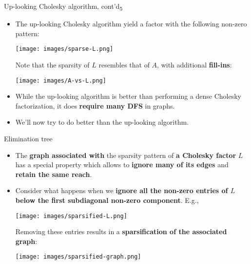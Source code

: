 \documentclass[t,usepdftitle=false]{beamer}
\begin{document}
\begin{frame}{Up-looking Cholesky algorithm, cont'd\textsubscript{5}}
\begin{itemize}
\item The up-looking Cholesky algorithm yield a factor with the following non-zero pattern:\\
\begin{center}
\texttt{[image: images/sparse-L.png]}
\end{center}
\vspace{.1cm}
Note that the sparsity of $L$ resembles that of $A$, with additional \textbf{fill-ins}:\vspace{.2cm}\\
\begin{center}
\texttt{[image: images/A-vs-L.png]}
\end{center}
\item While the up-looking algorithm is better than performing a dense Cholesky factorization, it does \textbf{require many DFS} in graphs.
\item We'll now try to do better than the up-looking algorithm.
\end{itemize}
\end{frame}

\begin{frame}{Elimination tree}
\begin{itemize}
\item The \textbf{graph associated with} the sparsity pattern of \textbf{a Cholesky factor} $L$ has a special property which allows to \textbf{ignore many of its edges} and \textbf{retain the same reach}.
\item Consider what happens when we \textbf{ignore all the non-zero entries of $L$ below the first subdiagonal non-zero component}. E.g.,\vspace{.15cm}
\begin{center}
\texttt{[image: images/sparsified-L.png]}
\end{center}
Removing these entries results in a \textbf{sparsification of the associated graph}:
\begin{center}
\texttt{[image: images/sparsified-graph.png]}
\end{center}
\end{itemize}
\end{frame}
\end{document}
